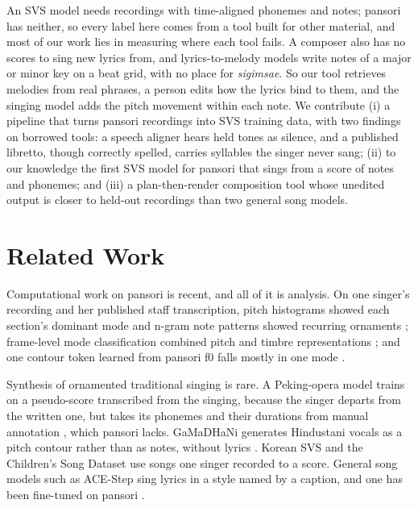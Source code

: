 \documentclass[wcp]{jmlr}
\begin{document}
An SVS model needs recordings with time-aligned phonemes and notes; pansori has neither,
so every label here comes from a tool built for other material, and most of our work lies
in measuring where each tool fails. A composer also has no scores to sing new
lyrics from, and lyrics-to-melody models
\citep{sheng2021songmass,ju2022telemelody,zhang2022relyme} write notes of a major or minor
key on a beat grid, with no place for \emph{sigimsae}. So our tool retrieves melodies from
real phrases, a person edits how the lyrics bind to them, and the singing model adds the
pitch movement within each note. We contribute (i) a pipeline that turns pansori recordings
into SVS training data, with two findings on borrowed tools: a speech aligner hears held
tones as silence, and a published libretto, though correctly spelled, carries syllables
the singer never sang; (ii) to our knowledge the first SVS model for pansori that sings
from a score of notes and phonemes; and (iii) a plan-then-render composition tool whose
unedited output is closer to held-out recordings than two general song models.

\section{Related Work}
Computational work on pansori is recent, and all of it is analysis.
On one
singer's recording and her published staff transcription, pitch histograms showed each
section's dominant mode and n-gram note patterns showed recurring ornaments
\citep{park2024towards}; frame-level mode classification combined pitch and timbre
representations \citep{park2026frame}; and one contour token learned from pansori f0 falls mostly in one
mode \citep{ju2026contour}.

Synthesis of ornamented traditional singing is rare. A Peking-opera model trains on a
pseudo-score transcribed from the singing, because the singer departs from the written
one, but takes its phonemes and their durations from manual annotation
\citep{wu2020peking}, which pansori lacks. GaMaDHaNi generates Hindustani vocals as a pitch
contour rather than as notes, without lyrics \citep{shikarpur2024gamadhani}. Korean SVS
\citep{lee2019adversarially,lee2021nsinger} and the Children's Song Dataset
\citep{choi2020childrens} use songs one singer recorded to a score. General song models such as ACE-Step
\citep{gong2025acestep,gong2026acestep} sing lyrics in a style named by a caption, and one
has been fine-tuned on pansori \citep{cho2025pansori}.
\end{document}
